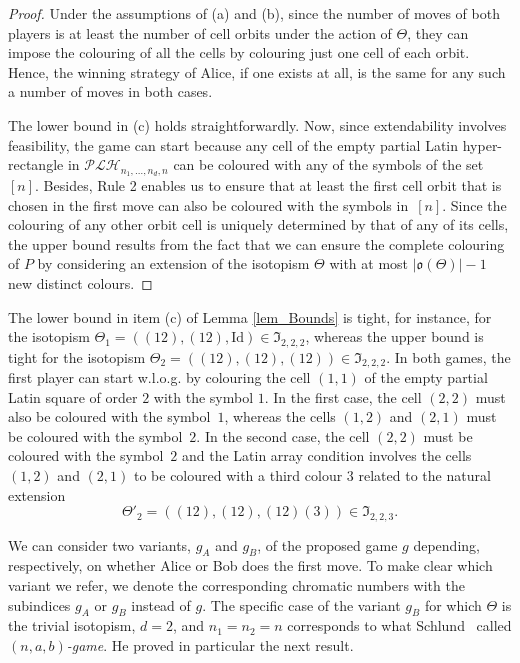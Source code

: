 \documentclass{article}
\begin{document}
\begin{proof} Under the assumptions of (a) and (b), since the number of moves of both players is at least the number of cell orbits under the action of $\Theta$, they can impose the colouring of all the cells by colouring just one cell of each orbit. Hence, the winning strategy of Alice, if one exists at all, is the same for any such a number of moves in both cases.

The lower bound in (c) holds straightforwardly. Now, since extendability involves feasibility, the game can start because any cell of the empty partial Latin hyper-rectangle in 
$\mathcal{PLH}_{n_1,\ldots,n_d,n}$ can be coloured with any of the symbols of the set $[n]$. Besides, Rule 2 enables us to ensure that at least the first cell orbit that is chosen in the first move can also be coloured with the symbols in~$[n]$. Since the colouring of any other orbit cell is uniquely determined by that of any of its cells, the upper bound results from the fact that we can ensure the complete colouring of $P$ by considering an extension of the isotopism $\Theta$ with at most $|\mathfrak{o}(\Theta)|-1$ new distinct colours.
\end{proof}

\vspace{0.1cm}

 The lower bound in item (c) of Lemma \ref{lem_Bounds} is tight, for instance, for the isotopism $\Theta_1=((12),(12),\mathrm{Id})\in\mathfrak{I}_{2,2,2}$, whereas the upper bound is tight for the isotopism 
 $\Theta_2=((12),(12),(12))\in\mathfrak{I}_{2,2,2}$. In both games, the first player can start w.l.o.g. by colouring the cell $(1,1)$ of the empty partial Latin square of order $2$ with the symbol $1$. In the first case, 
 the cell $(2,2)$ must also be coloured with the symbol~$1$, whereas the cells $(1,2)$ and $(2,1)$ must be coloured with the symbol~$2$. In the second case, the cell $(2,2)$ must be coloured with the symbol~$2$ and the 
 Latin array condition involves the cells $(1,2)$ and $(2,1)$ to be coloured with a third colour $3$ related to the natural extension 
\[\Theta'_2=((12),(12),(12)(3))\in\mathfrak{I}_{2,2,3}.\]

\vspace{0.3cm}

 We can consider two variants, $g_A$ and $g_B$, of the proposed game $g$ depending, respectively, on whether Alice or Bob does the first move. To make clear which variant we refer, we denote the corresponding chromatic 
 numbers with the subindices $g_A$ or $g_B$ instead of $g$. The specific case of the variant $g_B$ for which $\Theta$ is the trivial isotopism, $d=2$, and $n_1=n_2=n$ corresponds to 
what Schlund~\cite{Schlund2011} called 
 {\em $(n,a,b)$-game}. He proved in particular the next result.
\end{document}
